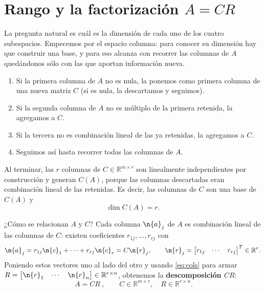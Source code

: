 \section{Rango y la factorización $A=CR$}
\label{sec:CR}

La pregunta natural es cuál es la dimensión de cada uno de los cuatro
subespacios. Empecemos por el espacio columna: para conocer su dimensión hay que
construir una base, y para eso alcanza con recorrer las columnas de $A$
quedándonos sólo con las que aportan información nueva.

\begin{enumerate}[itemsep=1pt]
    \item Si la primera columna de $A$ no es nula, la ponemos como primera
    columna de una nueva matriz $C$ (si es nula, la descartamos y seguimos).
    \item Si la segunda columna de $A$ no es múltiplo de la primera retenida, la
    agregamos a $C$.
    \item Si la tercera no es combinación lineal de las ya retenidas, la
    agregamos a $C$.
    \item Seguimos así hasta recorrer todas las columnas de $A$.
\end{enumerate}

Al terminar, las $r$ columnas de $C \in \mathbb{R}^{m \times r}$ son
linealmente independientes por construcción y generan $C(A)$, porque las
columnas descartadas eran combinación lineal de las retenidas. Es decir, las
columnas de $C$ son una base de $C(A)$ y
\[
\dim C(A) = r .
\]

¿Cómo se relacionan $A$ y $C$? Cada columna $\n{a}_j$ de $A$ es combinación
lineal de las columnas de $C$: existen coeficientes $r_{1j},\dots,r_{rj}$ con
\[
\n{a}_j = r_{1j}\n{c}_1 + \cdots + r_{rj}\n{c}_r = C\n{r}_j,
\qquad
\n{r}_j = \begin{bmatrix} r_{1j} & \cdots & r_{rj}\end{bmatrix}^T \in\mathbb{R}^r .
\]
Poniendo estos vectores uno al lado del otro y usando \eqref{eq:cols} para
armar $R = \begin{bmatrix} \n{r}_1 & \cdots & \n{r}_n \end{bmatrix}
\in \mathbb{R}^{r \times n}$, obtenemos la \textbf{descomposición $CR$}:
\[
\boxed{\ A = CR\ },
\qquad C\in\mathbb{R}^{m\times r},\quad R\in\mathbb{R}^{r\times n}.
\]

